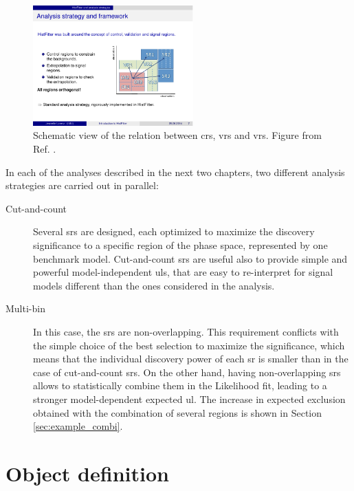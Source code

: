 \begin{figure}
\centering
\includegraphics[width=0.55\textwidth]{figures/susy_common/CR_VR}
\caption{Schematic view of the relation between \glspl{cr}, \glspl{vr} and \glspl{vr}. Figure from Ref. \cite{Baak:2014wma}.}
\label{fig:susy_common:CRschema}
\end{figure}
 
In each of the analyses described in the next two chapters, two different analysis strategies are carried out in parallel:
\begin{description}
\item[Cut-and-count] Several \glspl{sr} are designed, each optimized to maximize the discovery significance to a specific region of the phase space, represented by one benchmark model. Cut-and-count \glspl{sr} are useful also to provide simple and powerful model-independent \glspl{ul}, that are easy to re-interpret for signal models different than the ones considered in the analysis. 

\item[Multi-bin] In this case, the \glspl{sr} are non-overlapping. This requirement conflicts with the simple choice of the best selection to maximize the significance, which means that the individual discovery power of each \gls{sr} is smaller than in the case of cut-and-count \glspl{sr}. On the other hand, having non-overlapping \glspl{sr} allows to statistically combine them in the Likelihood fit, leading to a stronger model-dependent expected \gls{ul}. The increase in expected exclusion obtained with the combination of several regions is shown in Section \ref{sec:example_combi}.
 
\end{description}


\section{Object definition}
\label{sec:common_obj_def}

